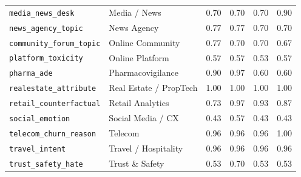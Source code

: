 \begin{tabular}{llrrrr}
\texttt{\small media\_news\_desk} & Media / News & 0.70 & 0.70 & 0.70 & 0.90 \\
\texttt{\small news\_agency\_topic} & News Agency & 0.77 & 0.77 & 0.70 & 0.70 \\
\texttt{\small community\_forum\_topic} & Online Community & 0.77 & 0.70 & 0.70 & 0.67 \\
\texttt{\small platform\_toxicity} & Online Platform & 0.57 & 0.57 & 0.53 & 0.57 \\
\texttt{\small pharma\_ade} & Pharmacovigilance & 0.90 & 0.97 & 0.60 & 0.60 \\
\texttt{\small realestate\_attribute} & Real Estate / PropTech & 1.00 & 1.00 & 1.00 & 1.00 \\
\texttt{\small retail\_counterfactual} & Retail Analytics & 0.73 & 0.97 & 0.93 & 0.87 \\
\texttt{\small social\_emotion} & Social Media / CX & 0.43 & 0.57 & 0.43 & 0.43 \\
\texttt{\small telecom\_churn\_reason} & Telecom & 0.96 & 0.96 & 0.96 & 1.00 \\
\texttt{\small travel\_intent} & Travel / Hospitality & 0.96 & 0.96 & 0.96 & 0.96 \\
\texttt{\small trust\_safety\_hate} & Trust \& Safety & 0.53 & 0.70 & 0.53 & 0.53 \\
\bottomrule
\end{tabular}